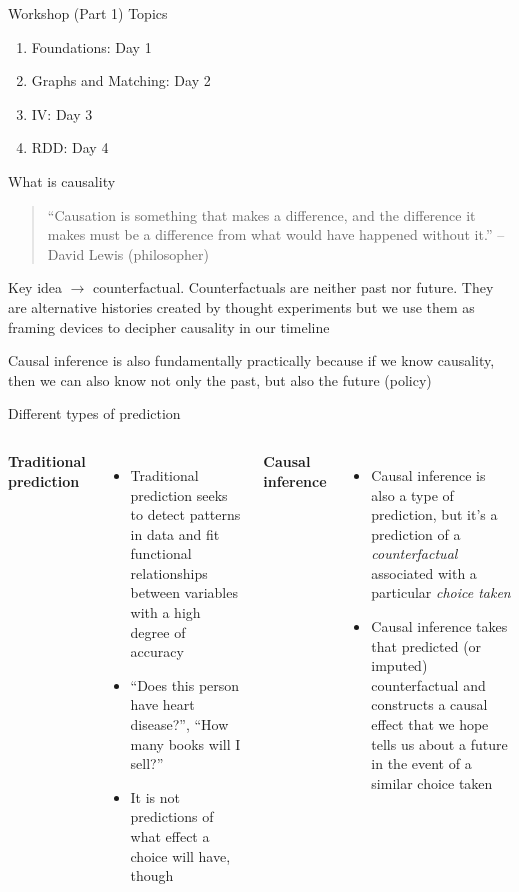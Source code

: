 \documentclass{beamer}
\begin{document}

\begin{frame}{Workshop (Part 1) Topics}

  \begin{enumerate}
    \item Foundations: Day 1
    \item Graphs and Matching: Day 2
    \item IV: Day 3
    \item RDD: Day 4
  \end{enumerate}

\end{frame}

\begin{frame}{What is causality}

  \begin{quote}
    ``Causation is something that makes a difference, and the difference it makes must be a difference from what would have happened without it.'' -- David Lewis (philosopher)
  \end{quote}

  \bigskip
  Key idea $\rightarrow$ counterfactual. Counterfactuals are neither past nor future.  They are alternative histories created by thought experiments but we use them as framing devices to decipher causality in our timeline

  \bigskip

  Causal inference is also fundamentally practically because if we know causality, then we can also know not only the past, but also the future (policy)

\end{frame}

\begin{frame}{Different types of prediction}

  \begin{columns}
    \centering
    \textbf{Traditional prediction}
    \begin{itemize}
      \item Traditional prediction seeks to detect patterns in data and fit functional relationships between variables with a high degree of accuracy
      \item ``Does this person have heart disease?'', ``How many books will I sell?''
      \item It is not predictions of what effect a choice will have, though
    \end{itemize}
    \centering
    \textbf{Causal inference}
    \begin{itemize}
      \item Causal inference is also a type of prediction, but it's a prediction of a \emph{counterfactual} associated with a particular \emph{choice taken}
      \item Causal inference takes that predicted (or imputed) counterfactual and constructs a causal effect that we hope tells us about a future in the event of a similar choice taken
    \end{itemize}
  \end{columns}
\end{frame}
\end{document}
